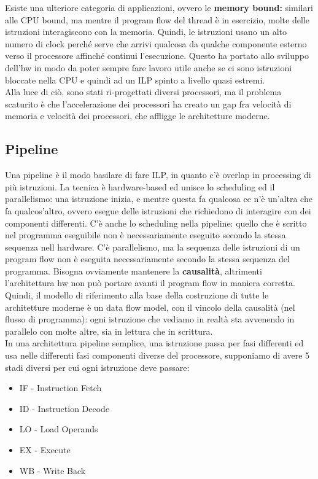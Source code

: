 \documentclass[12pt, oneside]{extbook}
\begin{document}
Esiste una ulteriore categoria di applicazioni, ovvero le \textbf{memory bound:} similari alle CPU bound, ma mentre il program flow del thread è in esercizio, molte delle istruzioni interagiscono con la memoria. Quindi, le istruzioni usano un alto numero di clock perché serve che arrivi qualcosa da qualche componente esterno verso il processore affinché continui l'esecuzione. Questo ha portato allo sviluppo dell'hw in modo da poter sempre fare lavoro utile anche se ci sono istruzioni bloccate nella CPU e quindi ad un ILP spinto a livello quasi estremi.\\ Alla luce di ciò, sono stati ri-progettati diversi processori, ma il problema scaturito è che l'accelerazione dei processori ha creato un gap fra velocità di memoria e velocità dei processori, che affligge le architetture moderne.
\subsection{Pipeline}
Una pipeline è il modo basilare di fare ILP, in quanto c'è overlap in processing di più istruzioni. La tecnica è hardware-based ed unisce lo scheduling ed il parallelismo: una istruzione inizia, e mentre questa fa qualcosa ce n'è un'altra che fa qualcos'altro, ovvero esegue delle istruzioni che richiedono di interagire con dei componenti differenti. C'è anche lo scheduling nella pipeline: quello che è scritto nel programma eseguibile non è necessariamente eseguito secondo la stessa sequenza nell hardware. C'è parallelismo, ma la sequenza delle istruzioni di un program flow non è eseguita necessariamente secondo la stessa sequenza del programma. Bisogna ovviamente mantenere la \textbf{causalità}, altrimenti l'architettura hw non può portare avanti il program flow in maniera corretta. Quindi, il modello di riferimento alla base della costruzione di tutte le architetture moderne è un data flow model, con il vincolo della causalità (nel flusso di programma): ogni istruzione che vediamo in realtà sta avvenendo in parallelo con molte altre, sia in lettura che in scrittura.\\ In una architettura pipeline semplice, una istruzione passa per fasi differenti ed usa nelle differenti fasi componenti diverse del processore, supponiamo di avere 5 stadi diversi per cui ogni istruzione deve passare:
\begin{itemize}
\item IF - Instruction Fetch
\item ID - Instruction Decode
\item LO - Load Operands
\item EX - Execute
\item WB - Write Back
\end{itemize}
\end{document}
